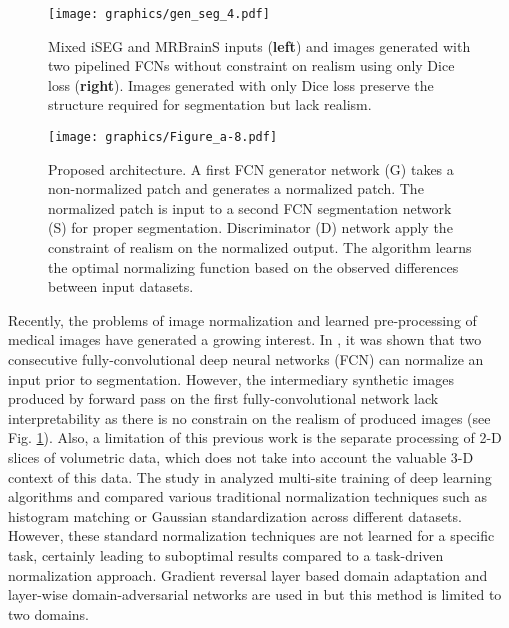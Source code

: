 \documentclass{article}
\begin{document}
\begin{figure}[h]
    \texttt{[image: graphics/gen\_seg\_4.pdf]}
    \caption{Mixed iSEG and MRBrainS inputs (\textbf{left}) and images generated with two pipelined FCNs without constraint on realism using only Dice loss (\textbf{right}). Images generated with only Dice loss preserve the structure required for segmentation but lack realism.}
    \label{fig1}
\end{figure}

\begin{figure*}[h]
\begin{center}
    \texttt{[image: graphics/Figure\_a-8.pdf]}
    \caption{Proposed architecture. A first FCN generator network (G) takes a non-normalized patch and generates a normalized patch. The normalized patch is input to a second FCN segmentation network (S) for proper segmentation. Discriminator (D) network apply the constraint of realism on the normalized output. The algorithm learns the optimal normalizing function based on the observed differences between input datasets.}
\end{center}
\end{figure*}

Recently, the problems of image normalization and learned pre-processing of medical images have generated a growing interest. In \cite{RN23}, it was shown that two consecutive fully-convolutional deep neural networks (FCN) can normalize an input prior to segmentation. However, the intermediary synthetic images produced by forward pass on the first fully-convolutional network lack interpretability as there is no constrain on the realism of produced images (see Fig. \ref{fig1}). Also, a limitation of this previous work is the separate processing of 2-D slices of volumetric data, which does not take into account the valuable 3-D context of this data. The study in \cite{Onofrey2019} analyzed multi-site training of deep learning algorithms and compared various traditional normalization techniques such as histogram matching \cite{Shapira2013MultipleHM} or Gaussian standardization across different datasets. However, these standard normalization techniques are not learned for a specific task, certainly leading to suboptimal results compared to a task-driven normalization approach. Gradient reversal layer based domain adaptation and layer-wise domain-adversarial networks are used in \cite{Ciga2019} but this method is limited to two domains.
\end{document}
